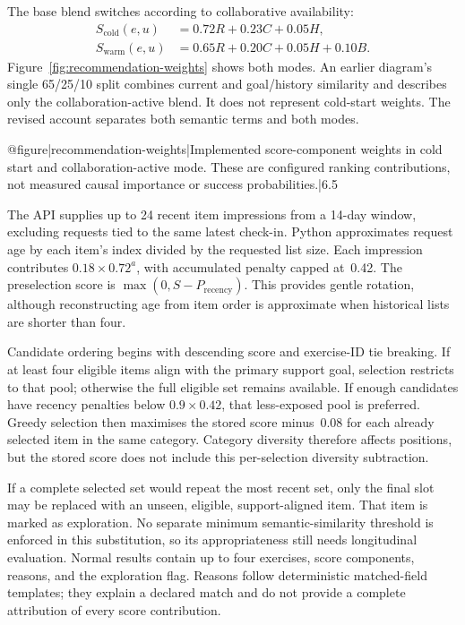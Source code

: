 The base blend switches according to collaborative availability:
\begin{align}
 S_{\mathrm{cold}}(e,u)&=0.72R+0.23C+0.05H,\label{eq:cold-start}\\
 S_{\mathrm{warm}}(e,u)&=0.65R+0.20C+0.05H+0.10B.\label{eq:warm-start}
\end{align}
Figure~\ref{fig:recommendation-weights} shows both modes. An earlier diagram's single 65/25/10 split combines current and goal/history similarity and describes only the collaboration-active blend. It does not represent cold-start weights. The revised account separates both semantic terms and both modes.

@figure|recommendation-weights|Implemented score-component weights in cold start and collaboration-active mode. These are configured ranking contributions, not measured causal importance or success probabilities.|6.5

The API supplies up to 24 recent item impressions from a 14-day window, excluding requests tied to the same latest check-in. Python approximates request age by each item's index divided by the requested list size. Each impression contributes $0.18\times0.72^a$, with accumulated penalty capped at~0.42. The preselection score is $\max(0,S-P_{\mathrm{recency}})$. This provides gentle rotation, although reconstructing age from item order is approximate when historical lists are shorter than four.

Candidate ordering begins with descending score and exercise-ID tie breaking. If at least four eligible items align with the primary support goal, selection restricts to that pool; otherwise the full eligible set remains available. If enough candidates have recency penalties below $0.9\times0.42$, that less-exposed pool is preferred. Greedy selection then maximises the stored score minus~0.08 for each already selected item in the same category. Category diversity therefore affects positions, but the stored score does not include this per-selection diversity subtraction.

If a complete selected set would repeat the most recent set, only the final slot may be replaced with an unseen, eligible, support-aligned item. That item is marked as exploration. No separate minimum semantic-similarity threshold is enforced in this substitution, so its appropriateness still needs longitudinal evaluation. Normal results contain up to four exercises, score components, reasons, and the exploration flag. Reasons follow deterministic matched-field templates; they explain a declared match and do not provide a complete attribution of every score contribution.

